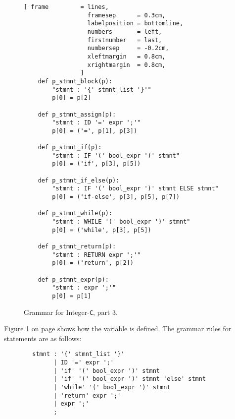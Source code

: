 \begin{figure}[!ht]
\centering
\begin{Verbatim}[ frame         = lines, 
                  framesep      = 0.3cm, 
                  labelposition = bottomline,
                  numbers       = left,
                  firstnumber   = last,
                  numbersep     = -0.2cm,
                  xleftmargin   = 0.8cm,
                  xrightmargin  = 0.8cm,
                ]
    def p_stmnt_block(p):
        "stmnt : '{' stmnt_list '}'"
        p[0] = p[2]
        
    def p_stmnt_assign(p):
        "stmnt : ID '=' expr ';'"
        p[0] = ('=', p[1], p[3])
        
    def p_stmnt_if(p):
        "stmnt : IF '(' bool_expr ')' stmnt"
        p[0] = ('if', p[3], p[5])   
        
    def p_stmnt_if_else(p):
        "stmnt : IF '(' bool_expr ')' stmnt ELSE stmnt"
        p[0] = ('if-else', p[3], p[5], p[7])
        
    def p_stmnt_while(p):
        "stmnt : WHILE '(' bool_expr ')' stmnt"
        p[0] = ('while', p[3], p[5])
        
    def p_stmnt_return(p):
        "stmnt : RETURN expr ';'"
        p[0] = ('return', p[2])
        
    def p_stmnt_expr(p):
        "stmnt : expr ';'"
        p[0] = p[1]
\end{Verbatim}
\vspace*{-0.3cm}
\caption{Grammar for Integer-\texttt{C}, part 3.}
\label{fig:Compiler.ipynb-3}
\end{figure}

\noindent
Figure \ref{fig:Compiler.ipynb-3} on page \pageref{fig:Compiler.ipynb-3} shows how the variable  is
defined.  The grammar rules for statements are as follows:
\begin{verbatim}
        stmnt : '{' stmnt_list '}'
              | ID '=' expr ';'
              | 'if' '(' bool_expr ')' stmnt
              | 'if' '(' bool_expr ')' stmnt 'else' stmnt
              | 'while' '(' bool_expr ')' stmnt
              | 'return' expr ';'
              | expr ';'
              ;
\end{verbatim}


